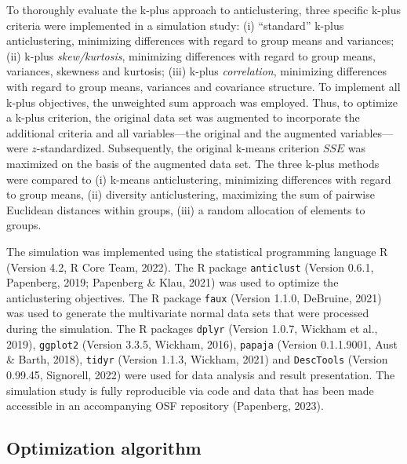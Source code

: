 \documentclass[
  man,floatsintext]{apa7}
\begin{document}
To thoroughly evaluate the k-plus approach to anticlustering, three specific k-plus criteria were implemented in a simulation study: (i) ``standard'' k-plus anticlustering, minimizing differences with regard to group means and variances; (ii) k-plus \emph{skew/kurtosis}, minimizing differences with regard to group means, variances, skewness and kurtosis; (iii) k-plus \emph{correlation}, minimizing differences with regard to group means, variances and covariance structure. To implement all k-plus objectives, the unweighted sum approach was employed. Thus, to optimize a k-plus criterion, the original data set was augmented to incorporate the additional criteria and all variables---the original and the augmented variables---were \(z\)-standardized. Subsequently, the original k-means criterion \(\mathit{SSE}\) was maximized on the basis of the augmented data set. The three k-plus methods were compared to (i) k-means anticlustering, minimizing differences with regard to group means, (ii) diversity anticlustering, maximizing the sum of pairwise Euclidean distances within groups, (iii) a random allocation of elements to groups.

The simulation was implemented using the statistical programming language R (Version 4.2, R Core Team, 2022). The R package \texttt{anticlust} (Version 0.6.1, Papenberg, 2019; Papenberg \& Klau, 2021) was used to optimize the anticlustering objectives. The R package \texttt{faux} (Version 1.1.0, DeBruine, 2021) was used to generate the multivariate normal data sets that were processed during the simulation. The R packages \texttt{dplyr} (Version 1.0.7, Wickham et al., 2019), \texttt{ggplot2} (Version 3.3.5, Wickham, 2016), \texttt{papaja} (Version 0.1.1.9001, Aust \& Barth, 2018), \texttt{tidyr} (Version 1.1.3, Wickham, 2021) and \texttt{DescTools} (Version 0.99.45, Signorell, 2022) were used for data analysis and result presentation. The simulation study is fully reproducible via code and data that has been made accessible in an accompanying OSF repository (Papenberg, 2023).

\hypertarget{optimization-algorithm}{%
\subsection{Optimization algorithm}\label{optimization-algorithm}}
\end{document}
